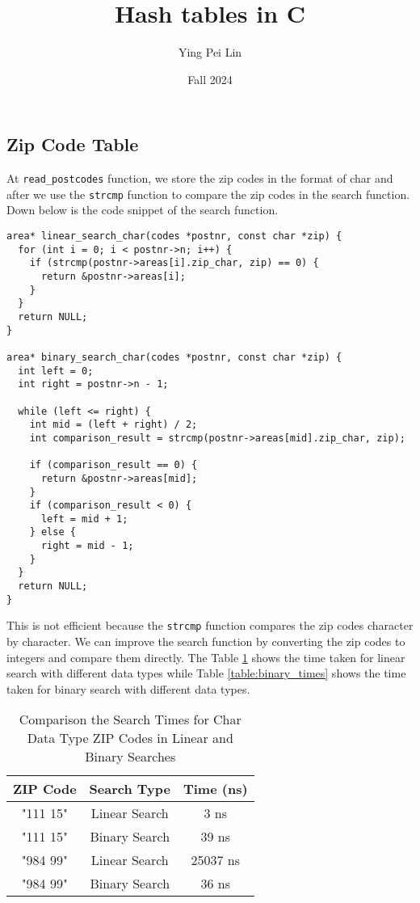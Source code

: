 \documentclass[a4paper,11pt]{article}
\begin{document}
\title{
  \textbf{Hash tables in C}
}
\author{Ying Pei Lin}
\date{Fall 2024}

\maketitle

\subsection*{Zip Code Table}

At {\tt read\_postcodes} function, we store the zip codes in the format of char and after
we use the {\tt strcmp} function to compare the zip codes in the search function. Down below
is the code snippet of the search function.

\begin{verbatim}
area* linear_search_char(codes *postnr, const char *zip) {
  for (int i = 0; i < postnr->n; i++) {
    if (strcmp(postnr->areas[i].zip_char, zip) == 0) {
      return &postnr->areas[i];
    }
  }
  return NULL;
}

area* binary_search_char(codes *postnr, const char *zip) {
  int left = 0;
  int right = postnr->n - 1;
  
  while (left <= right) {
    int mid = (left + right) / 2;
    int comparison_result = strcmp(postnr->areas[mid].zip_char, zip);
    
    if (comparison_result == 0) {
      return &postnr->areas[mid];
    }
    if (comparison_result < 0) {
      left = mid + 1;
    } else {
      right = mid - 1;
    }
  }
  return NULL;
}
\end{verbatim}

This is not efficient because the {\tt strcmp} function compares the zip codes character by character.
We can improve the search function by converting the zip codes to integers and compare them directly.
The Table \ref{table:linear_times} shows the time taken for linear search with different data types
while Table \ref{table:binary_times} shows the time taken for binary search with different data types.

\begin{table}[h!]
  \centering
  \begin{tabular}{|c|c|c|}
    \hline
    \textbf{ZIP Code} & \textbf{Search Type} & \textbf{Time (ns)} \\ \hline
    "111 15" & Linear Search & 3 ns \\ \hline
    "111 15" & Binary Search & 39 ns \\ \hline
    "984 99" & Linear Search & 25037 ns \\ \hline
    "984 99" & Binary Search & 36 ns \\ \hline
  \end{tabular}
  \caption{Comparison the Search Times for Char Data Type ZIP Codes in Linear and Binary Searches}
  \label{table:linear_times}
\end{table}
\end{document}
